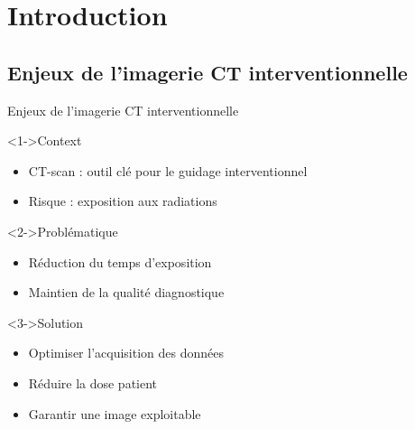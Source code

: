 \section{Introduction}
\subsection{Enjeux de l'imagerie CT interventionnelle}
\begin{frame}{Enjeux de l'imagerie CT interventionnelle}
    \transfade
    \begin{block}<1->{Context}
        \begin{itemize}
            \item CT-scan : outil clé pour le guidage interventionnel
            \item Risque : exposition aux radiations
        \end{itemize}
    \end{block}
    \begin{block}<2->{Problématique}
        \begin{itemize}
            \item Réduction du temps d'exposition
            \item Maintien de la qualité diagnostique
        \end{itemize}
    \end{block}
    \begin{block}<3->{Solution}
        \begin{itemize}
            \item Optimiser l'acquisition des données
            \item Réduire la dose patient
            \item Garantir une image exploitable
        \end{itemize}
    \end{block}
\end{frame}
